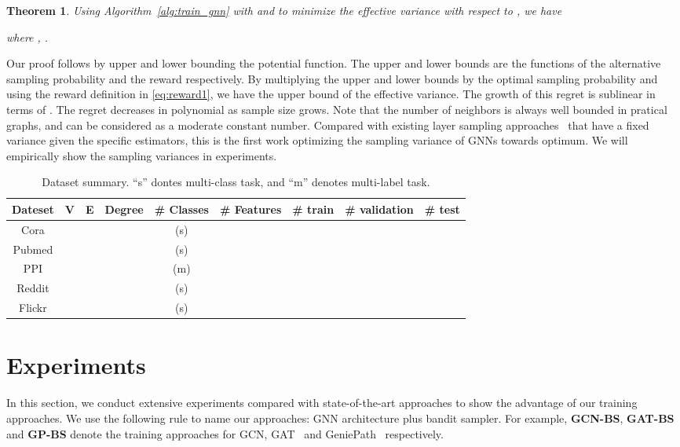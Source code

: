 \documentclass{article}
\newtheorem{theorem}{Theorem}
\begin{document}
\begin{theorem}
Using Algorithm~\ref{alg:train_gnn} with  
and  
to minimize the effective variance with respect 
to , we have 

where , .
\end{theorem}
Our proof follows \cite{salehi2017stochastic} by upper and lower bounding the potential function. The upper and lower bounds are the functions of the alternative sampling probability  and the reward  respectively. By multiplying the upper and lower bounds by the optimal sampling probability  and using the reward definition in \eqref{eq:reward1}, we have the upper bound of the effective variance.
The growth of this regret is sublinear in terms of .
The regret decreases in polynomial as sample size  grows.
Note that the number
of neighbors  is always well bounded in pratical graphs,
and can be considered as a moderate constant number.
Compared with existing layer sampling 
approaches~\cite{hamilton2017inductive,chen2018fastgcn,zou2019layer}
that have a fixed variance given the specific estimators, 
this is the first work optimizing the sampling
variance of GNNs towards optimum.
We will empirically show the sampling variances in experiments.

\setlength{\tabcolsep}{1pt}
{\footnotesize
\begin{table*}
  \centering
  \caption{Dataset summary. ``s'' dontes multi-class task, and ``m'' denotes multi-label task.}
  \label{tb:data}
  \begin{tabular}{ccccccccc}
    Dateset & V & E & Degree &  \# Classes & \# Features & \# train & \# validation & \# test \\
    \midrule
    Cora&   &  &  &  (s) &  &  &  &  \\
    Pubmed &  &  &  &  (s)  &  &  &  &  \\
    PPI &     &  &  &  (m) &  &  &  & \\
    Reddit &  &  &  &  (s) &  &  &  & \\
    Flickr &  &  &  &  (s) &  &  &  & \\
  \bottomrule
\end{tabular}
\end{table*}
}


\section{Experiments}
In this section, we conduct extensive experiments compared with 
state-of-the-art approaches to show the advantage of our training
approaches. We use the following rule
to name our approaches: GNN architecture plus bandit sampler.
For example, \textbf{GCN-BS}, \textbf{GAT-BS} and 
\textbf{GP-BS} denote the training
approaches for GCN, GAT~\cite{velivckovic2017graph} 
and GeniePath~\cite{liu2019geniepath} respectively.
\end{document}
